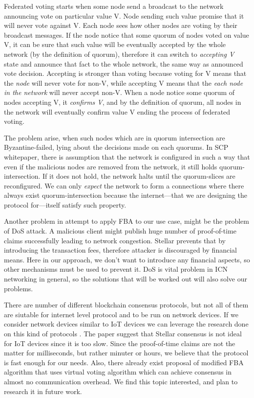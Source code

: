 \documentclass[nostrict]{szablonPG}
\begin{document}
Federated voting starts when some node send a broadcast to the network announcing vote on particular value V. Node sending such value promise that it will never vote against V. Each node sees how other nodes are voting by their broadcast messages. If the node notice that some quorum of nodes voted on value V, it can be sure that such value will be eventually accepted by the whole network (by the definition of quorum), therefore it can switch to \textit{accepting V} state and announce that fact to the whole network, the same way as announced vote decision. Accepting is stronger than voting because voting for V means that the \textit{node} will never vote for non-V, while accepting V means that the \textit{each node in the network} will never accept non-V. When a node notice some quorum of nodes accepting V, it \textit{confirms V}, and by the definition of quorum, all nodes in the network will eventually confirm value V ending the process of federated voting.

The problem arise, when such nodes which are in quorum intersection are Byzantine-failed, lying about the decisions made on each quorums. In SCP whitepaper, there is assumption that the network is configured in such a way that even if the malicious nodes are removed from the network, it still holds quorum-intersection. If it does not hold, the network halts until the quorum-slices are reconfigured.
We can only \textit{expect} the network to form a connections where there always exist quorum-intersection because the internet––that we are designing the protocol for––itself satisfy such property.

Another problem in attempt to apply FBA to our use case, might be the problem of DoS attack. A malicious client might publish huge number of proof-of-time claims successfully leading to network congestion. Stellar prevents that by introducing the transaction fees, therefore attacker is discouraged by financial means. Here in our approach, we don't want to introduce any financial aspects, so other mechanisms must be used to prevent it. DoS is vital problem in ICN networking in general\cite{gasti2013and}, so the solutions that will be worked out will also solve our problems. 

There are number of different blockchain consensus protocols, but not all of them are siutable for internet level protocol and to be run on network devices.
If we consider network devices similar to IoT devices we can leverage the research done on this kind of protocols \cite{salimitari2018survey}. The paper suggest that Stellar consensus is not ideal for IoT devices since it is too slow.
Since the proof-of-time claims are not the matter for milliseconds, but rather minuter or hours, we believe that the protocol is fast enough for our needs.
Also, there already exist proposal of modified FBA algorithm\cite{FCPpdf50:online} that uses virtual voting algorithm which can achieve consensus in almost no communication overhead. We find this topic interested, and plan to research it in future work.
\end{document}
